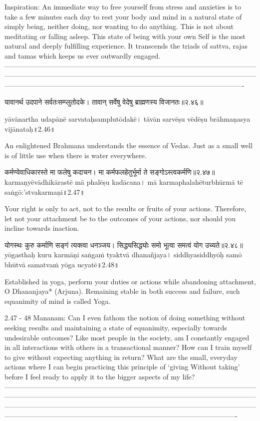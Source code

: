 Inspiration:
An immediate way to free yourself from stress and anxieties is to take a few minutes each day to rest your body and mind in a natural state of simply being, neither doing, nor wanting to do anything. This is not about meditating or falling asleep. This state of being with your own Self is the most natural and deeply fulfilling experience. It transcends the triads of sattva, rajas and tamas which keeps us ever outwardly engaged.
—----------------------------------------------------------------------------------------------------------------------------------------------------------------------------------------------------------------------------------------------------------------------------------------------------------------------------



यावानर्थ उदपाने सर्वतःसम्प्लुतोदके।
तावान् सर्वेषु वेदेषु ब्राह्मणस्य विजानतः॥२.४६॥

yāvānartha udapānē sarvataḥsamplutōdakē।
tāvān sarvēṣu vēdēṣu brāhmaṇasya vijānataḥ॥2.46॥

An enlightened Brahmana understands the essence of Vedas. Just as a small well is of little use when there is water everywhere. 


कर्मण्येवाधिकारस्ते मा फलेषु कदाचन। 
मा कर्मफलहेतुर्भूर्मा ते सङ्गोऽस्त्वकर्मणि॥२.४७॥
karmaṇyēvādhikārastē mā phalēṣu kadācana। 
mā karmaphalahēturbhūrmā tē saṅgō:'stvakarmaṇi॥2.47॥

Your right is only to act, not to the results or fruits of your actions. Therefore, let not your attachment be to the outcomes of your actions, nor should you incline towards inaction.

योगस्थः कुरु कर्माणि सङ्गं त्यक्त्वा धनञ्जय।
सिद्ध्यसिद्ध्योः समो भूत्वा समत्वं योग उच्यते॥२.४८॥
yōgasthaḥ kuru karmāṇi saṅgaṁ tyaktvā dhanañjaya।
siddhyasiddhyōḥ samō bhūtvā samatvaṁ yōga ucyatē॥2.48॥

Established in yoga, perform your duties or actions while abandoning attachment, O Dhananjaya* (Arjuna). Remaining stable in both success and failure, such equanimity of mind is called Yoga.

2.47 - 48 Mananam:
Can I even fathom the notion of doing something without seeking results and maintaining a state of equanimity, especially towards undesirable outcomes? Like most people in the society, am I constantly engaged in all interactions with others in a transactional manner? How can I train myself to give without expecting anything in return? What are the small, everyday actions where I can begin practicing this principle of ‘giving Without taking’ before I feel ready to apply it to the bigger aspects of my life? 
—-------------------------------------------------------------------------------------------------------------------------------------------------------------------------------------------------------------------------------------------------------------------------------------------------------------------------------------------------------------------------------------------------------------------------------------
 

